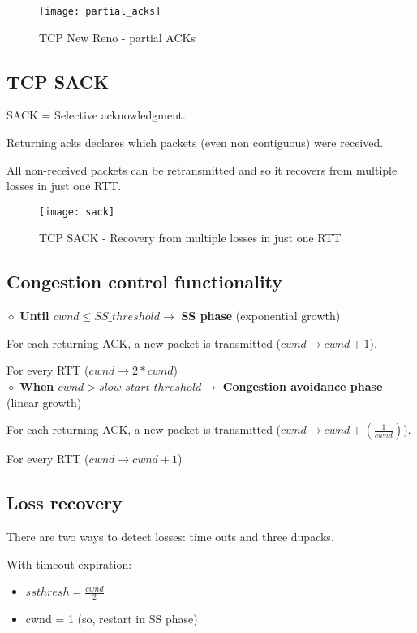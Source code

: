 \begin{figure}[H]
  \texttt{[image: partial\_acks]}
  \caption{TCP New Reno - partial ACKs}
\end{figure}

\subsection{TCP SACK}

SACK = Selective acknowledgment.

Returning acks declares which packets (even non contiguous) were received.

All non-received packets can be retransmitted and so it recovers from multiple
losses in just one RTT.

\begin{figure}[H]
  \texttt{[image: sack]}
  \caption{TCP SACK - Recovery from multiple losses in just one RTT}
\end{figure}

\subsection{Congestion control functionality}

$\diamond$ \textbf{Until $cwnd \leq SS\_threshold \rightarrow$} \textbf{SS phase}
(exponential growth)

For each returning ACK, a new packet is transmitted ($cwnd \rightarrow
cwnd + 1$).

For every RTT ($cwnd \rightarrow 2 * cwnd$) \\

$\diamond$ \textbf{When $cwnd > slow\_start\_threshold \rightarrow$}
\textbf{Congestion avoidance phase} (linear growth)

For each returning ACK, a new packet is transmitted ($cwnd \rightarrow
cwnd + (\frac{1}{cwnd})$).

For every RTT ($cwnd \rightarrow cwnd + 1$) \\

\subsection{Loss recovery}

There are two ways to detect losses: time outs and three dupacks.

With timeout expiration:

\begin{itemize}
  \item $ssthresh = \frac{cwnd}{2}$
  \item cwnd = 1 (so, restart in SS phase)
\end{itemize}

